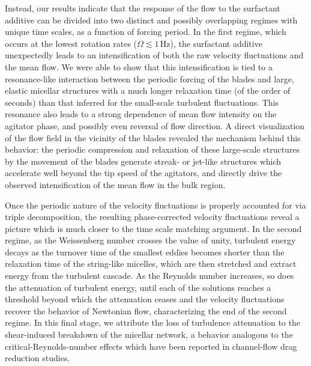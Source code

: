 \documentclass[aps,prfluids,groupedaddress,showkeys,11pt,tightenlines]{revtex4-2}
\begin{document}
Instead, our results indicate that the response of the flow to the surfactant additive can be divided into two distinct and possibly overlapping regimes with unique time scales, as a function of forcing period. In the first regime, which occurs at the lowest rotation rates ($\Omega \lesssim 1$\,Hz), the surfactant additive unexpectedly leads to an intensification of both the raw velocity fluctuations and the mean flow. We were able to show that this intensification is tied to a resonance-like interaction between the periodic forcing of the blades and large, elastic micellar structures with a much longer relaxation time (of the order of seconds) than that inferred for the small-scale turbulent fluctuations. This resonance also leads to a strong dependence of mean flow intensity on the agitator phase, and possibly even reversal of flow direction. A direct visualization of the flow field in the vicinity of the blades revealed the mechanism behind this behavior: the periodic compression and relaxation of these large-scale structures by the movement of the blades generate streak- or jet-like structures which accelerate well beyond the tip speed of the agitators, and directly drive the observed intensification of the mean flow in the bulk region.

Once the periodic nature of the velocity fluctuations is properly accounted for via triple decomposition, the resulting phase-corrected velocity fluctuations reveal a picture which is much closer to the time scale matching argument. In the second regime, as the Weissenberg number crosses the value of unity, turbulent energy decays as the turnover time of the smallest eddies becomes shorter than the relaxation time of the string-like micelles, which are then stretched and extract energy from the turbulent cascade. As the Reynolds number increases, so does the attenuation of turbulent energy, until each of the solutions reaches a threshold beyond which the attenuation ceases and the velocity fluctuations recover the behavior of Newtonian flow, characterizing the end of the second regime. In this final stage, we attribute the loss of turbulence attenuation to the shear-induced breakdown of the micellar network, a behavior analogous to the critical-Reynolds-number effects which have been reported in channel-flow drag reduction studies.
\end{document}
